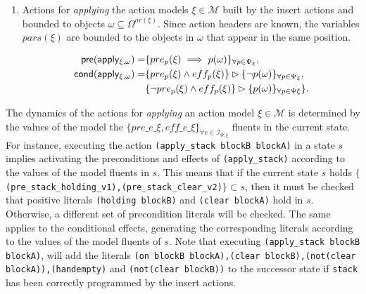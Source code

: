\documentclass{article}
\newcommand{\pre}{\mathsf{pre}}     %
\newcommand{\cond}{\mathsf{cond}}   %
\begin{document}
\begin{itemize}
\begin{enumerate}
\item Actions for {\em applying} the action models $\xi\in\mathcal{M}$ built by the insert actions and bounded to objects $\omega\subseteq\Omega^{ar(\xi)}$. Since action headers are known, the variables $pars(\xi)$ are bounded to the objects in $\omega$ that appear in the same position.

\begin{small}
\begin{align*}
\hspace*{7pt}\pre(\mathsf{apply_{\xi,\omega}})=&\{pre_{p}(\xi)\implies p(\omega)\}_{\forall p\in\Psi_\xi},\\
\cond(\mathsf{apply_{\xi,\omega}})=&\{pre_{p}(\xi)\wedge eff_{p}(\xi)\}\rhd\{\neg p(\omega)\}_{\forall p\in\Psi_\xi},\\
&\{\neg pre_{p}(\xi)\wedge eff_{p}(\xi)\}\rhd\{p(\omega)\}_{\forall p\in\Psi\xi}\}.
\end{align*}
\end{small}

\end{enumerate}
\end{itemize}

The dynamics of the actions for {\em applying} an action model $\xi\in\mathcal{M}$ is determined by the values of the model the $\{pre\_e\_\xi, eff\_e\_\xi\}_{\forall e\in{\mathcal I}_{\Psi,\xi}}$ fluents in the current state. For instance, executing the action {\tt{\small (apply\_stack blockB blockA)}} in a state $s$ implies activating the preconditions and effects of {\tt{\small (apply\_stack)}} according to the values of the model fluents in $s$. This means that if the current state $s$ holds {\scriptsize$\{${\tt (pre\_stack\_holding\_v1),(pre\_stack\_clear\_v2)}$\} \subset s$}, then it must be checked that positive literals {\tt{\small (holding blockB)}} and {\tt{\small (clear blockA)}} hold in $s$. Otherwise, a different set of precondition literals will be checked. The same applies to the conditional effects, generating the corresponding literals according to the values of the model fluents of $s$. Note that executing {\tt{\small (apply\_stack blockB blockA)}}, will add the literals {\tt{\small (on blockB blockA),(clear blockB),(not(clear blockA)),(handempty)}} and {\tt{\small(not(clear blockB))}} to the successor state if {\tt{\small stack}} has been correctly programmed by the insert actions.
\end{document}
